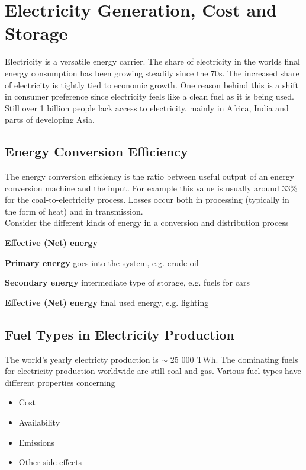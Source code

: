\section{Electricity Generation, Cost and Storage}

Electricity is a versatile energy carrier.
The share of electricity in the worlds final energy consumption has been growing steadily since the 70s.
The increased share of electricity is tightly tied to economic growth.
One reason behind this is a shift in consumer preference since electricity feels like a clean fuel as it is being used.
Still over 1 billion people lack access to electricity, mainly in Africa, India and parts of developing Asia.

\subsection{Energy Conversion Efficiency}
The energy conversion efficiency is the ratio between useful output of an energy conversion machine and the input.
For example this value is usually around 33\% for the coal-to-electricity process.
Losses occur both in processing (typically in the form of heat) and in transmission.\\

Consider the different kinds of energy in a conversion and distribution process

\begin{labeling}{\textbf{Effective (Net) energy}}
    \item [\textbf{Primary energy}] goes into the system, e.g. crude oil
    \item [\textbf{Secondary energy}] intermediate type of storage, e.g. fuels for cars
    \item [\textbf{Effective (Net) energy}] final used energy, e.g. lighting
\end{labeling}

\subsection{Fuel Types in Electricity Production}

The world's yearly electricty production is $\sim$ 25 000 TWh.
The dominating fuels for electricity production worldwide are still coal and gas.
Various fuel types have different properties concerning

\begin{itemize}
    \item Cost
    \item Availability
    \item Emissions
    \item Other side effects
\end{itemize}

